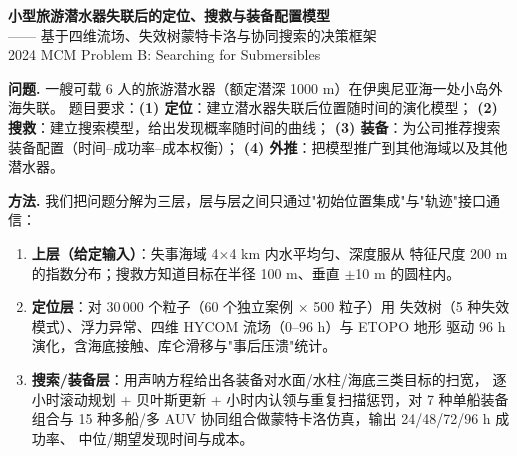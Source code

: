 \documentclass[UTF8,11pt,a4paper]{ctexart}
\begin{document}
\begin{center}
{\LARGE\bfseries 小型旅游潜水器失联后的定位、搜救与装备配置模型}\\[3mm]
{\large —— 基于四维流场、失效树蒙特卡洛与协同搜索的决策框架}\\[5mm]
{\normalsize 2024 MCM Problem B: Searching for Submersibles}
\end{center}

\vspace{2mm}
\noindent\textbf{问题.}
一艘可载 6 人的旅游潜水器（额定潜深 1000 m）在伊奥尼亚海一处小岛外海失联。
题目要求：\textbf{(1) 定位}：建立潜水器失联后位置随时间的演化模型；
\textbf{(2) 搜救}：建立搜索模型，给出发现概率随时间的曲线；
\textbf{(3) 装备}：为公司推荐搜索装备配置（时间–成功率–成本权衡）；
\textbf{(4) 外推}：把模型推广到其他海域以及其他潜水器。

\vspace{1.5mm}
\noindent\textbf{方法.}
我们把问题分解为三层，层与层之间只通过"初始位置集成"与"轨迹"接口通信：
\begin{enumerate}[leftmargin=1.6em,itemsep=0pt,topsep=1pt]
\item \textbf{上层（给定输入）}：失事海域 4$\times$4 km 内水平均匀、深度服从
     特征尺度 200 m 的指数分布；搜救方知道目标在半径 100 m、垂直 $\pm$10 m 的圆柱内。
\item \textbf{定位层}：对 30\,000 个粒子（60 个独立案例 $\times$ 500 粒子）用
      失效树（5 种失效模式）、浮力异常、四维 HYCOM 流场（0--96 h）与 ETOPO 地形
      驱动 96 h 演化，含海底接触、库仑滑移与"事后压溃"统计。
\item \textbf{搜索/装备层}：用声呐方程给出各装备对水面/水柱/海底三类目标的扫宽，
      逐小时滚动规划 + 贝叶斯更新 + 小时内认领与重复扫描惩罚，对 7 种单船装备组合与
      15 种多船/多 AUV 协同组合做蒙特卡洛仿真，输出 24/48/72/96 h 成功率、
      中位/期望发现时间与成本。
\end{enumerate}
\end{document}
